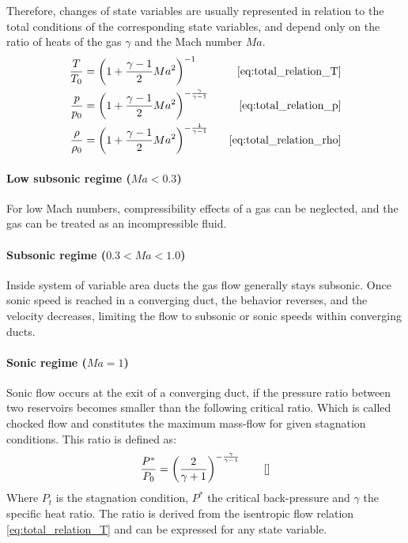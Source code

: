 	Therefore, changes of state variables are usually represented in relation to the total conditions of the corresponding state variables, and depend only on the ratio of heats of the gas $\gamma$ and the Mach number $Ma$.
	\begin{alignat*}{2}
	    \frac{T}{T_0}   & = \left( 1 + \frac{\gamma - 1}{2} Ma^2 \right)^{-1} \qquad &\eqref{eq:total_relation_T}\\
	    \frac{p}{p_0}   & = \left( 1 + \frac{\gamma - 1}{2} Ma^2 \right)^{-\frac{\gamma}{\gamma - 1}} &\eqref{eq:total_relation_p}\\
	    \frac{\rho}{\rho_0} & = \left( 1 + \frac{\gamma - 1}{2} Ma^2 \right)^{-\frac{1}{\gamma - 1}} &\eqref{eq:total_relation_rho}
	\end{alignat*}
	\paragraph{Low subsonic regime (\(Ma < 0.3\))}
		For low Mach numbers, compressibility effects of a gas can be neglected, and the gas can be treated as an incompressible fluid.

	\paragraph{Subsonic regime (\(0.3 < Ma < 1.0\))} 
		Inside system of variable area ducts the gas flow generally stays subsonic.
		Once sonic speed is reached in a converging duct, the behavior reverses, and the velocity decreases, limiting the flow to subsonic or sonic speeds within converging ducts.\\
	
			
	\paragraph{Sonic regime (\(Ma = 1\))}
		Sonic flow occurs at the exit of a converging duct, if the pressure ratio between two reservoirs becomes smaller than the following critical ratio.
		Which is called chocked flow and constitutes the maximum mass-flow for given stagnation conditions. 
		This ratio is defined as:
		$$
			\frac{P^*}{P_0}=\left(\frac{2}{\gamma + 1}\right)^{-\frac{\gamma}{\gamma - 1}} \qquad \eqref{}
		$$ 
		Where $P_t$ is the stagnation condition, $P^*$ the critical back-pressure and $\gamma$ the specific heat ratio.
		The ratio is derived from the isentropic flow relation \eqref{eq:total_relation_T} and can be expressed for any state variable.

